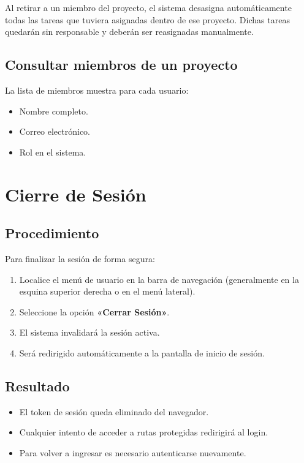 \documentclass[12pt, a4paper]{article}
\begin{document}
\begin{warningbox}
Al retirar a un miembro del proyecto, el sistema desasigna automáticamente todas las tareas que tuviera asignadas dentro de ese proyecto. Dichas tareas quedarán sin responsable y deberán ser reasignadas manualmente.
\end{warningbox}

\subsection{Consultar miembros de un proyecto}

La lista de miembros muestra para cada usuario:
\begin{itemize}
  \item Nombre completo.
  \item Correo electrónico.
  \item Rol en el sistema.
\end{itemize}

\section{Cierre de Sesión}

\subsection{Procedimiento}

Para finalizar la sesión de forma segura:

\begin{enumerate}
  \item Localice el menú de usuario en la barra de navegación (generalmente en la esquina superior derecha o en el menú lateral).
  \item Seleccione la opción \textbf{«Cerrar Sesión»}.
  \item El sistema invalidará la sesión activa.
  \item Será redirigido automáticamente a la pantalla de inicio de sesión.
\end{enumerate}

\subsection{Resultado}

\begin{itemize}
  \item El token de sesión queda eliminado del navegador.
  \item Cualquier intento de acceder a rutas protegidas redirigirá al login.
  \item Para volver a ingresar es necesario autenticarse nuevamente.
\end{itemize}
\end{document}
